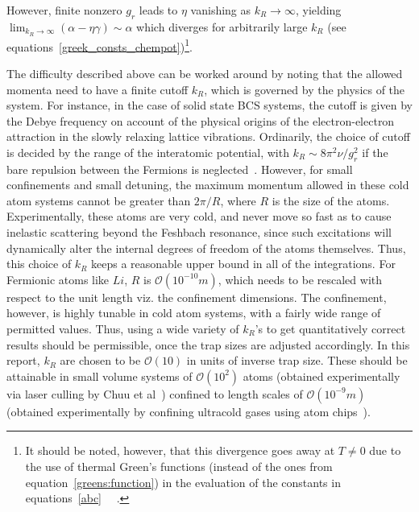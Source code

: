 \documentclass[a4paper,10pt]{article}
\begin{document}
 {However, finite nonzero $g_r$ leads to $\eta$ vanishing as $k_R\rightarrow\infty$, yielding $\lim_{k_R\rightarrow\infty}\left(\alpha-\eta\gamma\right) \sim \alpha$ which diverges for arbitrarily large $k_R$} (see equations~\ref{greek_consts_chempot})\footnote{ {It should be noted, however, that this divergence goes away at $T\neq 0$ due to the use of thermal Green's functions (instead of the ones from equation}~\ref{greens:function})  {in the evaluation of the constants in equations}~\ref{abc} ~\cite{machida:dynamics}~\cite{huang:bcsbecgp}.}.

 {The difficulty described above can be worked around by noting that the allowed momenta need to have a finite cutoff $k_R$, which is governed by the physics of the system. For instance, in the case of solid state BCS systems, the cutoff is given by the Debye frequency on account of the physical origins of the electron-electron attraction in the slowly relaxing lattice vibrations. Ordinarily, the choice of cutoff is decided by the range of the interatomic potential, with $k_R\sim 8\pi^2\nu/g^2_r$ if the bare repulsion between the Fermions is neglected~\cite{timmermans,pethick:bec}. However, for small confinements and small detuning, the maximum momentum allowed in these cold atom systems cannot be greater than $2\pi/R$, where $R$ is the size of the atoms. Experimentally, these atoms are very cold, and never move so fast as to cause inelastic scattering beyond the Feshbach resonance, since such excitations will dynamically alter the internal degrees of freedom of the atoms themselves. Thus, this choice of $k_R$ keeps a reasonable upper bound in all of the integrations. For Fermionic atoms like $Li$, $R$ is ${\mathcal O}(10^{-10}m)$, which needs to be rescaled with respect to the unit length viz. the confinement dimensions. The confinement, however, is highly tunable in cold atom systems, with a fairly wide range of permitted values. Thus, using a wide variety of $k_R$'s to get quantitatively correct results should be permissible, once the trap sizes are adjusted accordingly. In this report,  $k_R$ are chosen to be ${\mathcal O}(10)$ in units of inverse trap size. These should be attainable in small volume systems of ${\mathcal O}(10^2)$ atoms (obtained experimentally via laser culling by Chuu et al}~\cite{raizen:culling})  {confined to length scales of ${\mathcal O}(10^{-9}m)$  (obtained experimentally by confining ultracold gases using atom chips}~\cite{doublewell:chip}).
\end{document}
